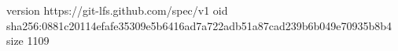 version https://git-lfs.github.com/spec/v1
oid sha256:0881c20114efafe35309e5b6416ad7a722adb51a87cad239b6b049e70935b8b4
size 1109
